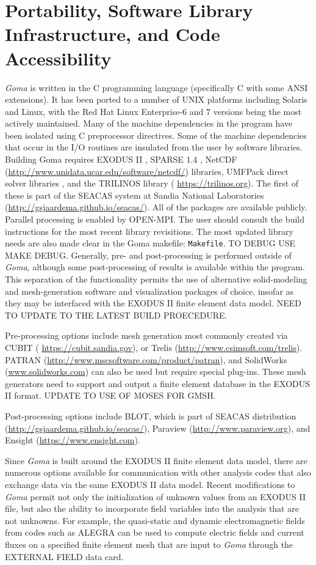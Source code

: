 \section{Portability, Software Library Infrastructure, and Code Accessibility}
%
%
\emph{Goma} is written in the C programming language (specifically \cite{C_Programming} C with some ANSI extensions). It has been ported to a number of UNIX platforms including Solaris and Linux, with the Red Hat Linux Enterprise-6 and 7 versions being the most actively maintained. Many of the machine dependencies in the program have been isolated using C preprocessor directives. Some of the machine dependencies that occur in the I/O routines are insulated from the user by software libraries. Building Goma requires EXODUS II \citep{ExodusII_SAND}, SPARSE 1.4 \citep{Sparse_User_Guide}, NetCDF (\url{http://www.unidata.ucar.edu/software/netcdf/}) libraries, UMFPack direct solver libraries \citep{UMFPack}, and the TRILINOS library  ( \url{https://trilinos.org}). The first of these is part of the SEACAS system at Sandia National Laboratories (\url{http://gsjaardema.github.io/seacas/}). All of the packages are available publicly. Parallel processing is enabled by OPEN-MPI. The user should consult the build instructions for the most recent library revisitions. The most updated library needs are also made clear in the Goma makefile: \texttt{Makefile}. TO DEBUG USE MAKE DEBUG. Generally, pre- and post-processing is performed outside of \emph{Goma}, although some post-processing of results is available within the program. This separation of the functionality permits the use of alternative solid-modeling and mesh-generation software and visualization packages of choice, insofar as they may be interfaced with the EXODUS II finite element data model. NEED TO UPDATE TO THE LATEST BUILD PROECEDURE.

Pre-processing options include mesh generation most commonly created via CUBIT ( \url{https://cubit.sandia.gov}), or Trelis (\url{http://www.csimsoft.com/trelis}). PATRAN (\url{http://www.mscsoftware.com/product/patran}), and SolidWorks (\url{www.solidworks.com}) can also be used but require special plug-ins. These mesh generators need to support and output a finite element database in the EXODUS II format. UPDATE TO USE OF MOSES FOR GMSH.

Post-processing options include BLOT, which is part of SEACAS distribution (\url{http://gsjaardema.github.io/seacas/}), Paraview (\url{http://www.paraview.org}), and Ensight (\url{https://www.ensight.com}).

Since \emph{Goma} is built around the EXODUS II finite element data model, there are numerous
options available for communication with other analysis codes that also exchange data via the
same EXODUS II data model. Recent modifications to \emph{Goma} permit not only the initialization of
unknown values from an EXODUS II file, but also the ability to incorporate field variables into
the analysis that are not unknowns. For example, the quasi-static and dynamic electromagnetic
fields from codes such as ALEGRA can be used to compute electric fields and current fluxes on a
specified finite element mesh that are input to \emph{Goma} through the EXTERNAL FIELD data card.
